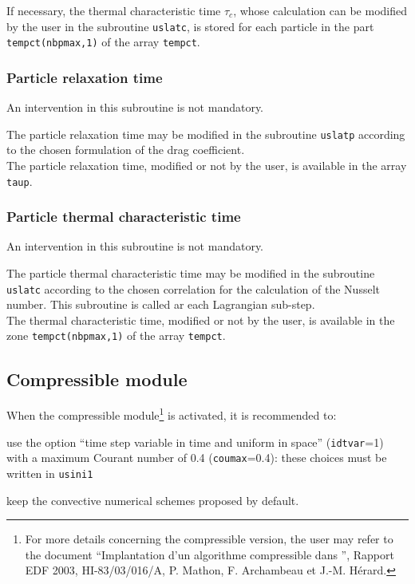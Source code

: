 {{{\noindent
If necessary, the thermal characteristic time $\tau_c$, whose
calculation can be modified by the user in the subroutine
\texttt{uslatc}, is stored for each particle in the part
\texttt{tempct(nbpmax,1)} of the array \texttt{tempct}.


\subsubsection{Particle relaxation time}

\noindent
An intervention in this subroutine is not mandatory.

\noindent
The particle relaxation time may be modified in the subroutine \texttt{uslatp} 
according to the chosen formulation of the drag coefficient. \\
The particle relaxation time, modified or not by the user, is available
in the array \texttt{taup}.

\subsubsection{Particle thermal characteristic time}

\noindent
An intervention in this subroutine is not mandatory.

\noindent
The particle thermal characteristic time may be
modified in the subroutine \texttt{uslatc} according to the chosen correlation 
for the calculation of the
Nusselt number. This subroutine is called ar each Lagrangian sub-step. \\
The thermal characteristic time, modified or not by the user, is
available in the zone \texttt{tempct(nbpmax,1)} of the array \texttt{tempct}.

\subsection{Compressible module}

When the compressible module\footnote{For more details concerning the
compressible version, the user may refer to the document ``Implantation
d'un algorithme compressible dans \CS'', Rapport EDF 2003,
HI-83/03/016/A, P. Mathon, F. Archambeau et J.-M. H\'erard.} is
activated, it is recommended to:
\begin{list}{-}{}
 \item use the option ``time step variable in time and uniform in
       space'' (\texttt{idtvar}=1) with a maximum Courant number of 0.4
       (\texttt{coumax}=0.4): these choices must be written in \texttt{usini1}
 \item keep the convective numerical schemes proposed by default.
\end{list}

}}}
